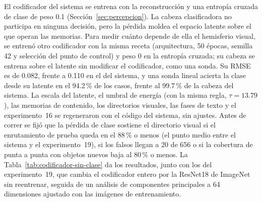 El codificador del sistema se entrena con la reconstrucción y una entropía cruzada de
clase de peso 0.1 (Sección~\ref{sec:percepcion}).
La cabeza clasificadora no participa en ninguna decisión, pero la pérdida moldea el
espacio latente sobre el que operan las memorias.
Para medir cuánto depende de ella el hemisferio visual, se entrenó otro codificador con
la misma receta (arquitectura, 50 épocas, semilla 42 y selección del punto de control) y
peso 0 en la entropía cruzada; su cabeza se entrena sobre el latente sin modificar el
codificador, como una sonda.
Su RMSE es de 0.082, frente a 0.110 en el del sistema, y una sonda lineal acierta la
clase desde su latente en el 94.2\,\% de los casos, frente al 99.7\,\% de la cabeza del
sistema.
La escala del latente, el umbral de energía (con la misma regla, $\tau = 13.79$), las
memorias de contenido, los directorios visuales, las fases de texto y el
experimento~16 se regeneraron con el código del sistema, sin ajustes.
Antes de correr se fijó que la pérdida de clase sostiene el directorio visual si el
enrutamiento de prueba queda en el 88\,\% o menos (el punto medio entre el sistema y el
experimento~19), si los falsos llegan a 20 de 656 o si la cobertura de punta a punta con
objetos nuevos baja al 80\,\% o menos.
La Tabla~\ref{tab:codificador-sin-clase} da los resultados, junto con los del
experimento~19, que cambia el codificador entero por la ResNet18 de ImageNet sin
reentrenar, seguida de un análisis de componentes principales a 64 dimensiones ajustado
con las imágenes de entrenamiento.

